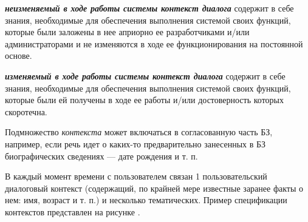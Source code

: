 \textit{\textbf{неизменяемый в ходе работы системы контекст диалога}} содержит в себе знания, необходимые для обеспечения выполнения системой своих функций,  которые были заложены в нее априорно ее разработчиками и/или администраторами и не изменяются в ходе ее функционирования на постоянной основе.

\textit{\textbf{изменяемый в ходе работы системы контекст диалога}} содержит в себе знания, необходимые для обеспечения выполнения системой своих функций,  которые были ей получены в ходе ее работы и/или достоверность которых скоротечна.

\begin{SCn}


    \begin{scnindent}
        \begin{scneqtoset}
        \end{scneqtoset}
    \end{scnindent}
    \begin{scnindent}
        \begin{scneqtoset}
        \end{scneqtoset}
    \end{scnindent}

\end{SCn}

Подмножество \textit{контекста} может включаться в согласованную часть БЗ, например, если речь идет о каких-то предварительно занесенных в БЗ биографических сведениях --- дате рождения и т. п.

В каждый момент времени с пользователем связан 1 пользовательский диалоговый контекст (содержащий, по крайней мере известные заранее факты о нем: имя, возраст и т. п.) и несколько тематических.
Пример спецификации контекстов представлен на рисунке \textit{}.

